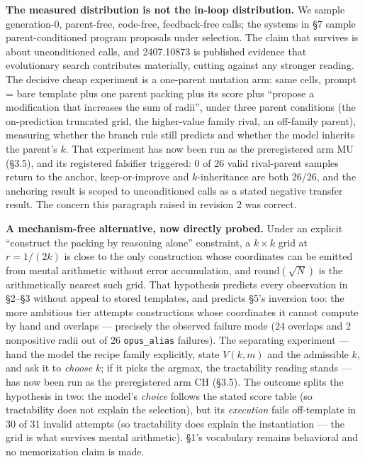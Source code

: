 \documentclass[11pt]{article}
\begin{document}
\textbf{The measured distribution is not the in-loop distribution.} We sample generation-0,
parent-free, code-free, feedback-free calls; the systems in \S7 sample parent-conditioned program
proposals under selection. The claim that survives is about unconditioned calls, and 2407.10873
is published evidence that evolutionary search contributes materially, cutting against any
stronger reading. The decisive cheap experiment is a one-parent mutation arm: same cells,
prompt = bare template plus one parent packing plus its score plus ``propose a modification that
increases the sum of radii'', under three parent conditions (the on-prediction truncated grid,
the higher-value family rival, an off-family parent), measuring whether the branch rule still
predicts and whether the model inherits the parent's $k$. That experiment has now been run as
the preregistered arm MU (\S3.5), and its registered falsifier triggered: 0 of 26 valid
rival-parent samples return to the anchor, keep-or-improve and $k$-inheritance are both
26/26, and the anchoring result is scoped to unconditioned calls as a stated negative
transfer result. The concern this paragraph raised in revision 2 was correct.

\textbf{A mechanism-free alternative, now directly probed.} Under an explicit ``construct the packing by
reasoning alone'' constraint, a $k \times k$ grid at $r = 1/(2k)$ is close to the only construction whose
coordinates can be emitted from mental arithmetic without error accumulation, and $\mathrm{round}(\sqrt{N})$ is
the arithmetically nearest such grid. That hypothesis predicts every observation in \S2--\S3
without appeal to stored templates, and predicts \S5's inversion too: the more ambitious tier
attempts constructions whose coordinates it cannot compute by hand and overlaps --- precisely the
observed failure mode (24 overlaps and 2 nonpositive radii out of 26 \texttt{opus\_alias} failures). The
separating experiment --- hand the model the recipe family explicitly, state $V(k, m)$ and the
admissible $k$, and ask it to \textit{choose} $k$; if it picks the argmax, the tractability reading stands
--- has now been run as the preregistered arm CH (\S3.5). The outcome splits the hypothesis
in two: the model's \textit{choice} follows the stated score table (so tractability does not
explain the selection), but its \textit{execution} fails off-template in 30 of 31 invalid
attempts (so tractability does explain the instantiation --- the grid is what survives mental
arithmetic). \S1's vocabulary remains behavioral and no memorization claim is made.
\end{document}
